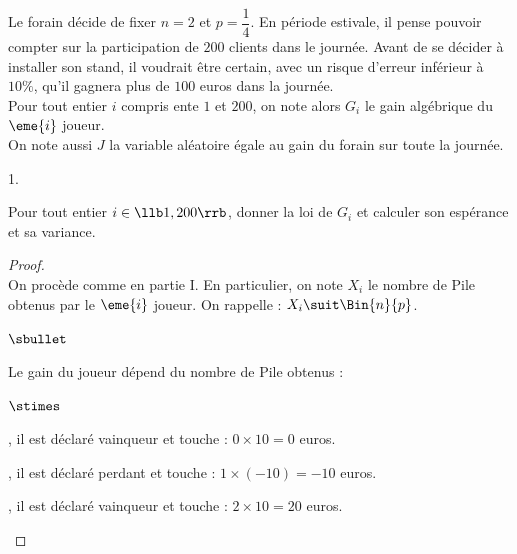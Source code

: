 \noindent
Le forain décide de fixer $n = 2$ et $p = \dfrac{1}{4}$. En période
estivale, il pense pouvoir compter sur la participation de $200$
clients dans le journée. Avant de se décider à installer son stand, il
voudrait être certain, avec un risque d'erreur inférieur à $10 \%$,
qu'il gagnera plus de $100$ euros dans la journée.\\
Pour tout entier $i$ compris ente $1$ et $200$, on note alors $G_{i}$
le gain algébrique du $\eme{i}$ joueur.\\
On note aussi $J$ la variable aléatoire égale au gain du forain sur
toute la journée.
\begin{noliste}{1.}
  \setlength{\itemsep}{4mm}
\item Pour tout entier $i \in \llb 1,200 \rrb$, donner la loi de
  $G_{i}$ et calculer son espérance et sa variance.
  
  \begin{proof}~\\%
    On procède comme en partie I. En particulier, on note $X_i$ le
    nombre de Pile obtenus par le $\eme{i}$ joueur. On rappelle : $X_i
    \suit \Bin{n}{p}$.
    \begin{noliste}{$\sbullet$}
    \item Le gain du joueur dépend du nombre de Pile obtenus : 
      \begin{noliste}{$\stimes$}
      \item {}, il est déclaré
        vainqueur et touche : $0 \times 10 = 0$ euros.

      \item {}, il est déclaré
        perdant et touche : $1 \times (-10) = -10$ euros.

      \item {}, il est déclaré
        vainqueur et touche : $2 \times 10 = 20$ euros.
      \end{noliste}


\end{noliste}
\end{proof}
\end{noliste}
